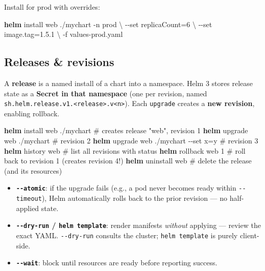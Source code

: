 \documentclass[11pt]{article}
\providecommand{\tightlist}{\setlength{\itemsep}{1pt}\setlength{\parskip}{0pt}}
\newenvironment{Shaded}{\begin{snugshade}}{\end{snugshade}}
\newcommand{\AttributeTok}[1]{\textcolor[rgb]{0.16,0.50,0.73}{#1}}
\newcommand{\CommentTok}[1]{\textcolor[rgb]{0.48,0.49,0.49}{#1}}
\newcommand{\DataTypeTok}[1]{\textcolor[rgb]{0.16,0.50,0.73}{#1}}
\newcommand{\ExtensionTok}[1]{\textcolor[rgb]{0.00,0.60,1.00}{\textbf{#1}}}
\newcommand{\NormalTok}[1]{\textcolor[rgb]{0.81,0.81,0.76}{#1}}
\begin{document}
Install for prod with overrides:


\begin{Shaded}
\begin{Highlighting}[]
\ExtensionTok{helm}\NormalTok{ install web ./mychart }\AttributeTok{{-}n}\NormalTok{ prod }\DataTypeTok{\textbackslash{}}
  \AttributeTok{{-}{-}set}\NormalTok{ replicaCount=6 }\DataTypeTok{\textbackslash{}}
  \AttributeTok{{-}{-}set}\NormalTok{ image.tag=1.5.1 }\DataTypeTok{\textbackslash{}}
  \AttributeTok{{-}f}\NormalTok{ values{-}prod.yaml}
\end{Highlighting}
\end{Shaded}

\subsection{Releases \& revisions}\label{releases--revisions}

A \textbf{release} is a named install of a chart into a namespace. Helm 3 stores release state as a \textbf{Secret in that namespace} (one per revision, named \texttt{sh.helm.release.v1.\textless{}release\textgreater{}.v\textless{}n\textgreater{}}). Each \texttt{upgrade} creates a \textbf{new revision}, enabling rollback.


\begin{Shaded}
\begin{Highlighting}[]
\ExtensionTok{helm}\NormalTok{ install web ./mychart            }\CommentTok{\# creates release "web", revision 1}
\ExtensionTok{helm}\NormalTok{ upgrade web ./mychart            }\CommentTok{\# revision 2}
\ExtensionTok{helm}\NormalTok{ upgrade web ./mychart }\AttributeTok{{-}{-}set}\NormalTok{ x=y  }\CommentTok{\# revision 3}
\ExtensionTok{helm}\NormalTok{ history web                      }\CommentTok{\# list all revisions with status}
\ExtensionTok{helm}\NormalTok{ rollback web 1                   }\CommentTok{\# roll back to revision 1 (creates revision 4!)}
\ExtensionTok{helm}\NormalTok{ uninstall web                    }\CommentTok{\# delete the release (and its resources)}
\end{Highlighting}
\end{Shaded}

\begin{itemize}
\tightlist
\item
  \textbf{\texttt{-\/-atomic}}: if the upgrade fails (e.g., a pod never becomes ready within \texttt{-\/-timeout}), Helm automatically rolls back to the prior revision --- no half-applied state.
\item
  \textbf{\texttt{-\/-dry-run} / \texttt{helm\ template}}: render manifests \emph{without} applying --- review the exact YAML. \texttt{-\/-dry-run} consults the cluster; \texttt{helm\ template} is purely client-side.
\item
  \textbf{\texttt{-\/-wait}}: block until resources are ready before reporting success.
\end{itemize}
\end{document}
